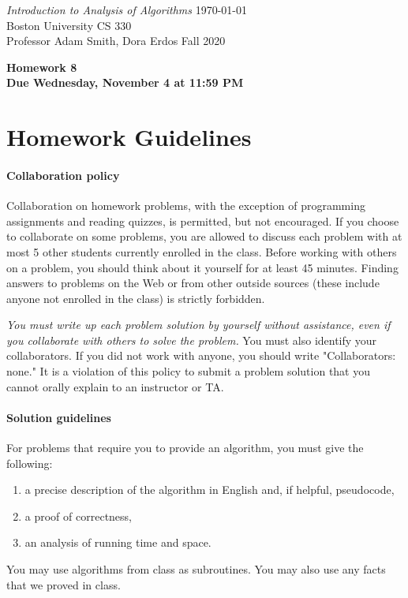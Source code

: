 \documentclass[letterpaper,11pt]{article}
\begin{document}
{\noindent\large
{\em Introduction to Analysis of Algorithms} \hfill \today\\
Boston University \hfill CS 330\\
Professor  Adam Smith, Dora Erdos \hfill Fall 2020\\}
\vspace{1pt}
\hrulefill\vspace{3mm}
\begin{center}
{\LARGE\bf Homework 8}\\
{\bf Due Wednesday, November 4 at 11:59 PM}
\end{center}
\section*{Homework Guidelines}

\paragraph{Collaboration policy} Collaboration on homework problems, with the exception of
programming assignments and reading quizzes, is permitted, but not encouraged.
If you
choose to collaborate on some problems, you are allowed to discuss
each problem with at most 5 other students currently enrolled in the
class.
Before working with others on a problem, you should think about it
yourself for at least 45 minutes. Finding answers to problems on the
Web or from other outside sources (these include anyone not enrolled
in the class) is strictly forbidden.

{\em You must write up each problem solution by yourself without
assistance, even if you collaborate with others to solve the
problem.} You must also identify your collaborators. If you did not
work with anyone, you should write "Collaborators: none." It is a
violation of this policy to submit a problem solution that you
cannot orally explain to an instructor or TA.

\paragraph{Solution guidelines} For problems that require you to provide an algorithm, you must give the following:
    \begin{enumerate}
\item  a precise description of the algorithm in English and, if helpful, pseudocode,
\item a proof of correctness,
\item an analysis of running time and space.
\end{enumerate}
You may use algorithms from class as subroutines. You may also use any facts that we proved in class.
\end{document}
